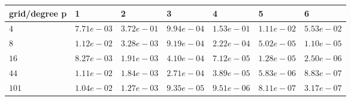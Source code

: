 \begin{tabular}{lllllll}
\hline
 grid/degree p   & 1          & 2          & 3          & 4          & 5          & 6          \\
\hline
 $4$             & $7.71e-03$ & $3.72e-01$ & $9.94e-04$ & $1.53e-01$ & $1.11e-02$ & $5.53e-02$ \\
 $8$             & $1.12e-02$ & $3.28e-03$ & $9.19e-04$ & $2.22e-04$ & $5.02e-05$ & $1.10e-05$ \\
 $16$            & $8.27e-03$ & $1.91e-03$ & $4.10e-04$ & $7.12e-05$ & $1.28e-05$ & $2.50e-06$ \\
 $44$            & $1.11e-02$ & $1.84e-03$ & $2.71e-04$ & $3.89e-05$ & $5.83e-06$ & $8.83e-07$ \\
 $101$           & $1.04e-02$ & $1.27e-03$ & $9.35e-05$ & $9.51e-06$ & $8.11e-07$ & $3.17e-07$ \\
\hline
\end{tabular}